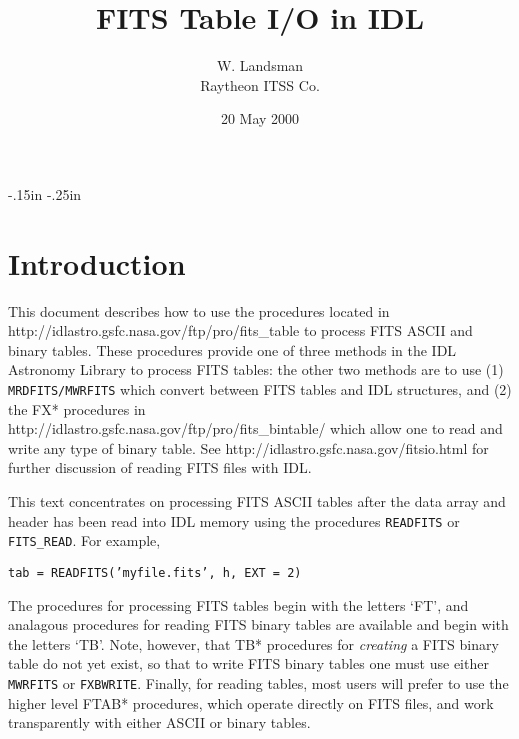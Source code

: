 \topmargin -0.5in
\oddsidemargin-.15in
\evensidemargin-.25in
\textheight 8.5in     
\textwidth 6.5in
\newcommand{\exbegin}{\par\medskip}
\newcommand{\exend}{\medskip\noindent}
\newcommand{\exc}[2]{
\hbox to \hsize{\small\hskip .2in
\parbox[t]{2.8in}{\raggedright\setlength{\parindent}{-.2in}\tt #1}
\hspace{.2in}
\parbox[t]{3.8in}{\raggedright\setlength{\parindent}{-.2in}\rm #2}\hss}
\prevdepth=1.5pt\relax}
\newcommand{\exone}[1]{\begin{center}\tt #1 \end{center}}
\title{FITS Table I/O in IDL}
\author{W. Landsman \\ Raytheon ITSS Co.}
\date{20 May 2000}

\maketitle
\section{Introduction} 

This document describes how to use the procedures located in \\
http://idlastro.gsfc.nasa.gov/ftp/pro/fits\_table to process FITS ASCII and
binary tables.    These procedures provide one of three methods in the IDL
Astronomy Library to process FITS tables: the other two methods are to use (1)
{\tt MRDFITS/MWRFITS} which convert between FITS tables and IDL structures, and (2)
the FX* procedures in \\
http://idlastro.gsfc.nasa.gov/ftp/pro/fits\_bintable/ which allow one to read
and write any type of binary table.  See
http://idlastro.gsfc.nasa.gov/fitsio.html for further discussion of reading
FITS files with IDL.

This text concentrates on processing FITS ASCII tables after the data array and
header  has been read into IDL memory using the procedures {\tt READFITS} or
{\tt FITS\_READ}.   For example,

\exone{tab = READFITS('myfile.fits', h, EXT = 2) }

The procedures for processing FITS tables begin with the letters `FT', and 
analagous procedures for reading FITS binary tables are available and begin
with the letters `TB'.   Note, however, that TB* procedures for {\em creating}
a FITS binary table do not yet exist, so that to write FITS binary tables one
must use either {\tt MWRFITS} or {\tt FXBWRITE}.     Finally, for reading
tables, most users will
prefer to use the higher level FTAB* procedures, which operate directly on FITS
files, and work transparently with either ASCII or binary tables.

